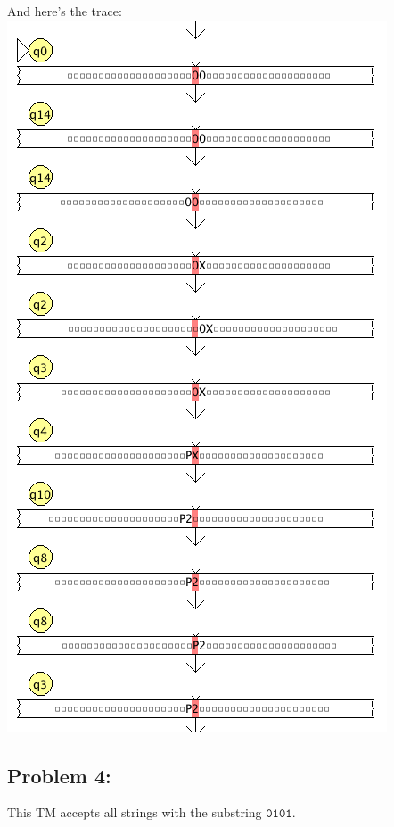 \documentclass[a4paper]{article}
\begin{document}
And here's the trace: \\

\includegraphics[scale=0.50]{p3_trace.png}

\subsection*{Problem 4:}

This TM accepts all strings with the substring $\texttt{0101}$.
\end{document}
